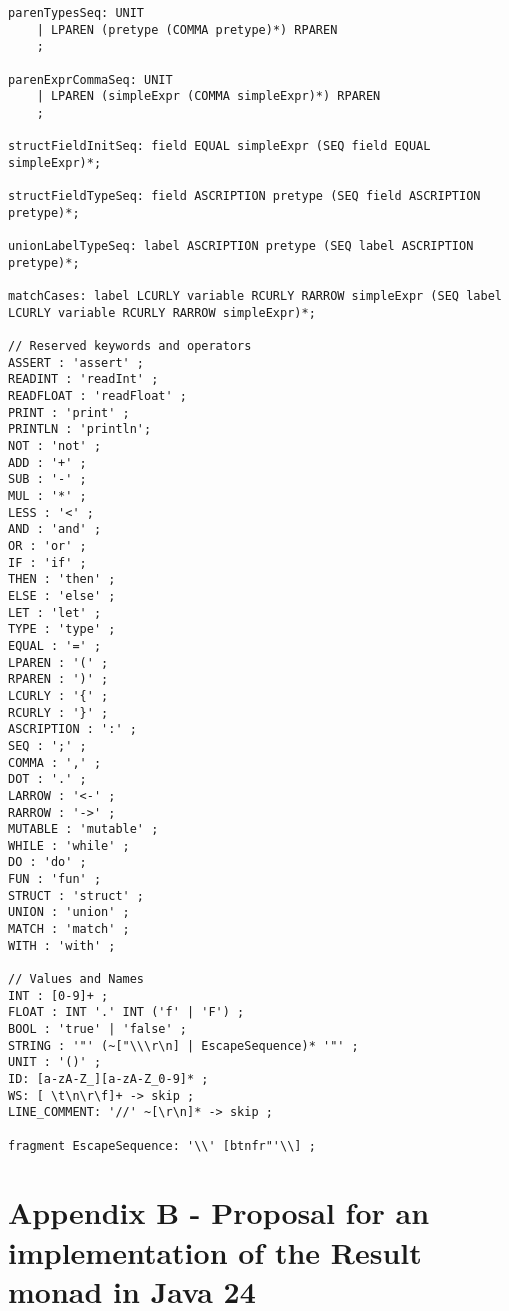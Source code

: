 \begin{lstlisting}
parenTypesSeq: UNIT
    | LPAREN (pretype (COMMA pretype)*) RPAREN
    ;

parenExprCommaSeq: UNIT
    | LPAREN (simpleExpr (COMMA simpleExpr)*) RPAREN
    ;

structFieldInitSeq: field EQUAL simpleExpr (SEQ field EQUAL simpleExpr)*;

structFieldTypeSeq: field ASCRIPTION pretype (SEQ field ASCRIPTION pretype)*;

unionLabelTypeSeq: label ASCRIPTION pretype (SEQ label ASCRIPTION pretype)*;

matchCases: label LCURLY variable RCURLY RARROW simpleExpr (SEQ label LCURLY variable RCURLY RARROW simpleExpr)*;

// Reserved keywords and operators
ASSERT : 'assert' ;
READINT : 'readInt' ;
READFLOAT : 'readFloat' ;
PRINT : 'print' ;
PRINTLN : 'println';
NOT : 'not' ;
ADD : '+' ;
SUB : '-' ;
MUL : '*' ;
LESS : '<' ;
AND : 'and' ;
OR : 'or' ;
IF : 'if' ;
THEN : 'then' ;
ELSE : 'else' ;
LET : 'let' ;
TYPE : 'type' ;
EQUAL : '=' ;
LPAREN : '(' ;
RPAREN : ')' ;
LCURLY : '{' ;
RCURLY : '}' ;
ASCRIPTION : ':' ;
SEQ : ';' ;
COMMA : ',' ;
DOT : '.' ;
LARROW : '<-' ;
RARROW : '->' ;
MUTABLE : 'mutable' ;
WHILE : 'while' ;
DO : 'do' ;
FUN : 'fun' ;
STRUCT : 'struct' ;
UNION : 'union' ;
MATCH : 'match' ;
WITH : 'with' ;

// Values and Names
INT : [0-9]+ ;
FLOAT : INT '.' INT ('f' | 'F') ;
BOOL : 'true' | 'false' ;
STRING : '"' (~["\\\r\n] | EscapeSequence)* '"' ;
UNIT : '()' ;
ID: [a-zA-Z_][a-zA-Z_0-9]* ;
WS: [ \t\n\r\f]+ -> skip ;
LINE_COMMENT: '//' ~[\r\n]* -> skip ;

fragment EscapeSequence: '\\' [btnfr"'\\] ; 
\end{lstlisting}

\chapter{Appendix B - Proposal for an implementation of the Result monad in Java 24} \label{appendix:result_java}

